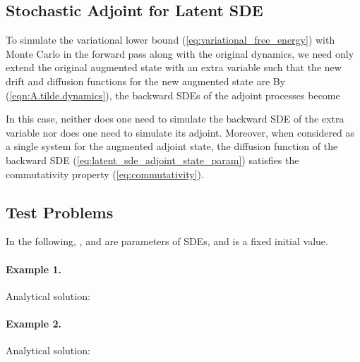 \documentclass[twoside]{article}
\begin{document}
 \subsection{Stochastic Adjoint for Latent SDE}\label{app:latent_sde_adjoint}
To simulate the variational lower bound (\ref{eq:variational_free_energy}) with Monte Carlo in the forward pass along with the original dynamics, we need only extend the original augmented state with an extra variable  such that the new drift and diffusion functions for the new augmented state  are
By (\ref{eqn:A.tilde.dynamics}), the backward SDEs of the adjoint processes become

In this case, neither does one need to simulate the backward SDE of the extra variable nor does one need to simulate its adjoint. Moreover, when considered as a single system for the augmented adjoint state, the diffusion function of the backward SDE (\ref{eq:latent_sde_adjoint_state_param}) satisfies the commutativity property (\ref{eq:commutativity}). 

 \subsection{Test Problems}\label{app:test_problems}
In the following, , and  are parameters of SDEs, and  is a fixed initial value.

\paragraph{Example 1.}
Analytical solution:

\paragraph{Example 2.}
Analytical solution:
\end{document}
